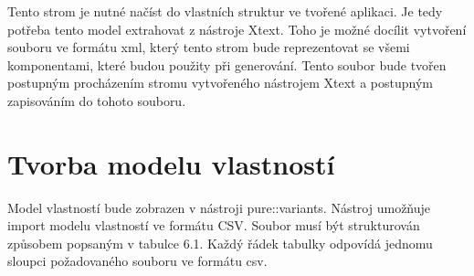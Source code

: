 Tento strom je nutné načíst do vlastních struktur ve tvořené aplikaci. Je tedy potřeba tento model extrahovat z nástroje Xtext. Toho je možné docílit vytvoření souboru ve formátu xml, který tento strom bude reprezentovat se všemi komponentami, které budou použity při generování. Tento soubor bude tvořen postupným procházením stromu vytvořeného nástrojem Xtext a postupným zapisováním do tohoto souboru.

\section{Tvorba modelu vlastností}
Model vlastností bude zobrazen v nástroji pure::variants. Nástroj umožňuje import modelu vlastností ve formátu CSV. Soubor musí být strukturován způsobem popsaným v tabulce 6.1. Každý řádek tabulky odpovídá jednomu sloupci požadovaného souboru ve formátu csv.

